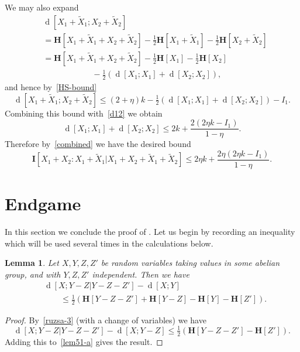 \documentclass[12pt,reqno,tbtags]{amsart}
\newtheorem{lemma}[theorem]{Lemma}
\theoremstyle{definition}
\theoremstyle{remark}
\renewcommand{\leq}{\leqslant}
\newcommand{\ent}[1]{\mathbf{H}[#1]}
\newcommand{\I}[1]{\mathbf{I}[#1]}
\newcommand{\dist}[2]{{\operatorname{d}[#1;#2]}} %
\numberwithin{equation}{section}
\begin{document}
We may also expand
\begin{align*}
 & \dist{X_1+\tilde X_1}{X_2+\tilde X_2} \\ &= \ent{ X_1+\tilde X_1 + X_2 + \tilde X_2}  - \tfrac{1}{2} \ent{X_1+\tilde X_1} - \tfrac{1}{2} \ent{X_2+\tilde X_2} \\
  &= \ent{ X_1+\tilde X_1 + X_2 + \tilde X_2}  - \tfrac{1}{2} \ent{X_1} - \tfrac{1}{2} \ent{X_2}  \\ & \qquad\qquad\qquad   - \tfrac{1}{2} \left( \dist{X_1}{X_1} + \dist{X_2}{X_2} \right),
\end{align*}
and hence by~\eqref{HS-bound}
\[
  \dist{X_1+\tilde X_1}{X_2+\tilde X_2} \leq (2+\eta) k - \tfrac{1}{2} \left( \dist{X_1}{X_1} + \dist{X_2}{X_2} \right) - I_1.
\]
Combining this bound with~\eqref{d12} we obtain
\begin{equation}\label{x12}
  \dist{X_1}{X_1} + \dist{X_2}{X_2} \leq 2 k + \frac{2(2 \eta k - I_1)}{1-\eta}.
\end{equation}
Therefore by~\eqref{combined} we have the desired bound
\[
\I{ X_1+X_2 : X_1 + \tilde X_1 | X_1+X_2+\tilde X_1+\tilde X_2 } \leq 2 \eta k + \frac{2\eta(2\eta k - I_1)}{1-\eta}.
\]

\section{Endgame}\label{endgame}

In this section we conclude the proof of .  Let us begin by recording an inequality which will be used several times in the calculations below.
\begin{lemma}\label{second-useful}
Let $X, Y, Z, Z'$ be random variables taking values in some abelian group, and with $Y, Z, Z'$ independent. Then we have
\begin{align}\nonumber
& \dist{X}{Y - Z | Y - Z - Z'} - \dist{X}{Y} \\ & \qquad \leq \tfrac{1}{2} ( \ent{Y - Z - Z'} + \ent{Y - Z} - \ent{Y} - \ent{Z'}).\label{7111}
\end{align}
\end{lemma}
\begin{proof}
By~\eqref{ruzsa-3} (with a change of variables) we have
\[ \dist{X}{Y - Z | Y - Z - Z'} - \dist{X}{Y - Z} \leq \tfrac{1}{2}( \ent{Y - Z - Z'} - \ent{Z'}).\]
Adding this to~\eqref{lem51-a} gives the result.
\end{proof}
\end{document}
